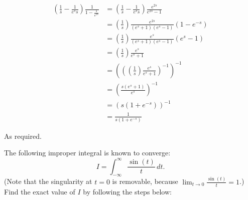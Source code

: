 \documentclass[answers]{exam}
\newcommand\starscore[2]{%
  \pgfmathsetmacro\pgfxa{#1 + 1}%
  \tikzstyle{scorestars}=[star, star points=5, star point ratio=2.5, draw, inner sep=0.12em, anchor=outer point 3]%
  \begin{tikzpicture}[baseline=2pt]
    \foreach \i in {1, ..., #2} {
      \pgfmathparse{\i<=#1 ? "black" : "white"}
      \edef\starcolor{\pgfmathresult}
      \draw (\i*1em, 0) node[name=star\i, scorestars, fill=\starcolor, semithick]  {};
    }
    \pgfmathparse{#1>int(#1) ? int(#1+1) : 0}
    \let\partstar=\pgfmathresult
    \ifnum\partstar>0
      \pgfmathsetmacro\starpart{#1-(int(#1)}
      \path [clip] ($(star\partstar.outer point 3)!(star\partstar.outer point 2)!(star\partstar.outer point 4)$) rectangle 
      ($(star\partstar.outer point 2 |- star\partstar.outer point 1)!\starpart!(star\partstar.outer point 1 -| star\partstar.outer point 5)$);
      \fill (\partstar*1em, 0) node[scorestars, fill=black]  {};
    \fi
  \end{tikzpicture}%
}
\begin{document}
\begin{questions}
\begin{parts}
\begin{solution}
    \begin{align*}
        \left( \frac{1}{s} - \frac{1}{e^s s} \right) \frac{1}{1 - \frac{1}{e^{2s}}}  &=  \left( \frac{1}{s} - \frac{1}{e^s s} \right) \frac{e^{2s}}{e^{2s} - 1} \\
                                                                                     &=  \left( \frac{1}{s} \right) \frac{e^{2s}}{(e^s + 1) (e^s - 1)} (1 - e^{-s}) \\
                                                                                     &=  \left( \frac{1}{s} \right) \frac{e^s}{(e^s + 1) (e^s - 1)} (e^s - 1) \\
                                                                                     &= \left( \frac{1}{s} \right) \frac{e^s}{e^s + 1} \\
                                                                                     &= \left( \left( \left( \frac{1}{s} \right) \frac{e^s}{e^s + 1} \right)^{-1} \right)^{-1} \\
                                                                                     &= \left( \frac{s(e^s + 1)}{e^s} \right)^{-1} \\
                                                                                     &= \left( s(1 + e^{-s}) \right)^{-1} \\
                                                                                     &= \frac{1}{s(1 + e^{-s})}
    \end{align*}

    As required.
\end{solution}

\end{parts}

\question\label{q:sinc}
The following improper integral is known to converge:
\[
I=\int_{-\infty}^\infty \frac{\sin(t)}{t}\,dt.
\]
(Note that the singularity at $t=0$ is removable,
because $\lim_{t\to 0}\frac{\sin(t)}t = 1$.)
\\
Find the exact value of $I$ by following the steps below:

\end{questions}
\end{document}
